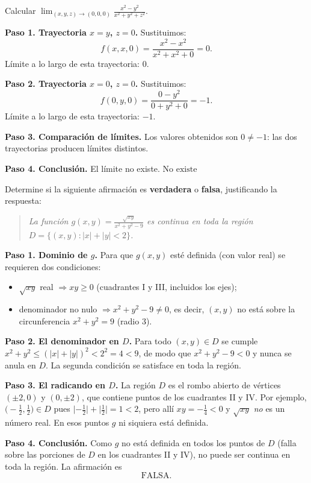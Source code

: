 \begin{example}
Calcular $\displaystyle\lim_{(x,y,z)\to(0,0,0)} \frac{x^2 - y^2}{x^2+y^2+z^2}$.
\begin{myproof}
\textbf{Paso 1. Trayectoria $x=y$, $z=0$.} Sustituimos:
\[
f(x,x,0) = \frac{x^2 - x^2}{x^2+x^2+0} = 0.
\]
Límite a lo largo de esta trayectoria: $0$.

\textbf{Paso 2. Trayectoria $x=0$, $z=0$.} Sustituimos:
\[
f(0,y,0) = \frac{0 - y^2}{0+y^2+0} = -1.
\]
Límite a lo largo de esta trayectoria: $-1$.

\textbf{Paso 3. Comparación de límites.} Los valores obtenidos son
$0\neq -1$: las dos trayectorias producen límites distintos.

\textbf{Paso 4. Conclusión.} El límite no existe.
$\boxed{\text{No existe}}$
\end{myproof}
\end{example}

\begin{prob}
Determine si la siguiente afirmación es \textbf{verdadera} o \textbf{falsa},
justificando la respuesta:
\begin{quote}
\itshape La función $\displaystyle g(x,y)=\frac{\sqrt{xy}}{x^2+y^2-9}$ es
continua en toda la región $D=\{(x,y):|x|+|y|<2\}$.
\end{quote}
\begin{myproof}
\textbf{Paso 1. Dominio de $g$.} Para que $g(x,y)$ esté definida (con valor
real) se requieren dos condiciones:
\begin{itemize}
  \item $\sqrt{xy}$ real $\Rightarrow xy\ge 0$ (cuadrantes I y III, incluidos
        los ejes);
  \item denominador no nulo $\Rightarrow x^2+y^2-9\neq 0$, es decir, $(x,y)$
        no está sobre la circunferencia $x^2+y^2=9$ (radio $3$).
\end{itemize}

\textbf{Paso 2. El denominador en $D$.} Para todo $(x,y)\in D$ se cumple
$x^2+y^2\le(|x|+|y|)^2<2^2=4<9$, de modo que $x^2+y^2-9<0$ y nunca se anula
en $D$. La segunda condición se satisface en toda la región.

\textbf{Paso 3. El radicando en $D$.} La región $D$ es el rombo abierto de
vértices $(\pm2,0)$ y $(0,\pm2)$, que contiene puntos de los cuadrantes II y
IV. Por ejemplo, $\bigl(-\tfrac12,\tfrac12\bigr)\in D$ pues
$\lvert-\tfrac12\rvert+\lvert\tfrac12\rvert=1<2$, pero allí
$xy=-\tfrac14<0$ y $\sqrt{xy}$ \emph{no} es un número real. En esos puntos
$g$ ni siquiera está definida.

\textbf{Paso 4. Conclusión.} Como $g$ no está definida en todos los puntos de
$D$ (falla sobre las porciones de $D$ en los cuadrantes II y IV), no puede ser
continua en toda la región. La afirmación es
\[
  \boxed{\text{FALSA.}}
\]
\end{myproof}
\end{prob}

